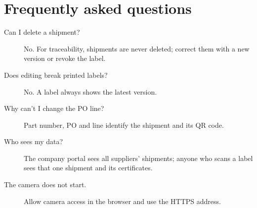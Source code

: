 \documentclass[11pt,a4paper]{article}
\begin{document}
\section{Frequently asked questions}
\begin{description}
  \item[Can I delete a shipment?] No. For traceability, shipments are never deleted; correct them with a new version or
    revoke the label.
  \item[Does editing break printed labels?] No. A label always shows the latest version.
  \item[Why can't I change the PO line?] Part number, PO and line identify the shipment and its QR code.
  \item[Who sees my data?] The company portal sees all suppliers' shipments; anyone who scans a label sees that one
    shipment and its certificates.
  \item[The camera does not start.] Allow camera access in the browser and use the HTTPS address.
\end{description}
\end{document}
